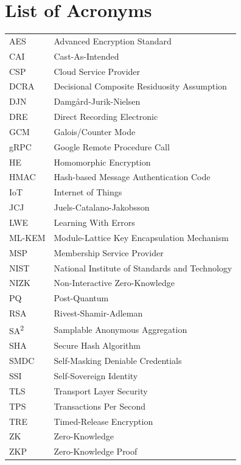 \newpage
\chapter*{List of Acronyms}

\begin{tabular}{ll}
AES     & Advanced Encryption Standard \\
CAI     & Cast-As-Intended \\
CSP     & Cloud Service Provider \\
DCRA    & Decisional Composite Residuosity Assumption \\
DJN     & Damg\aa rd-Jurik-Nielsen \\
DRE     & Direct Recording Electronic \\
GCM     & Galois/Counter Mode \\
gRPC    & Google Remote Procedure Call \\
HE      & Homomorphic Encryption \\
HMAC    & Hash-based Message Authentication Code \\
IoT     & Internet of Things \\
JCJ     & Juels-Catalano-Jakobsson \\
LWE     & Learning With Errors \\
ML-KEM  & Module-Lattice Key Encapsulation Mechanism \\
MSP     & Membership Service Provider \\
NIST    & National Institute of Standards and Technology \\
NIZK    & Non-Interactive Zero-Knowledge \\
PQ      & Post-Quantum \\
RSA     & Rivest-Shamir-Adleman \\
SA\textsuperscript{2}     & Samplable Anonymous Aggregation \\
SHA     & Secure Hash Algorithm \\
SMDC    & Self-Masking Deniable Credentials \\
SSI     & Self-Sovereign Identity \\
TLS     & Transport Layer Security \\
TPS     & Transactions Per Second \\
TRE     & Timed-Release Encryption \\
ZK      & Zero-Knowledge \\
ZKP     & Zero-Knowledge Proof \\
\end{tabular}
